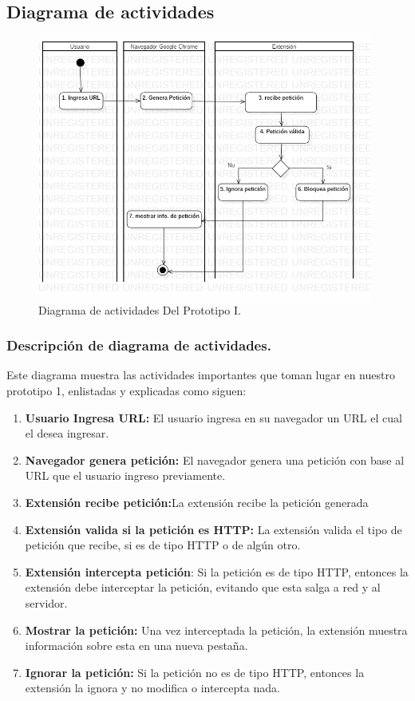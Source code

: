 \documentclass[12pt, a4paper, titlepage]{report}
\begin{document}
			        
			        
			\subsection{Diagrama de actividades}
			    \begin{figure}[H]
				    \begin{center} \includegraphics[width=11cm]{./imagenes/Desarrollo/Prototipo_1/DA_P1.png}
				        \caption{Diagrama de actividades Del Prototipo I.}
			        \end{center}
			    \end{figure}
			    
			\subsubsection{Descripción de diagrama de actividades.}
			Este diagrama muestra las actividades importantes que toman lugar en nuestro prototipo 1, enlistadas y explicadas como siguen: 
			
			\begin{enumerate}
			    \item \textbf{Usuario Ingresa URL:} El usuario ingresa en su navegador un URL el cual el desea ingresar.
			    \item \textbf{Navegador genera petición:} El navegador genera una petición con base al URL que el usuario ingreso previamente.
			    \item \textbf{Extensión recibe petición:}La extensión recibe la petición generada
			    \item \textbf{Extensión valida si la petición es HTTP:} La extensión valida el tipo de petición que recibe, si es de tipo HTTP o de algún otro.
			    \item \textbf{Extensión intercepta petición}: Si la petición es de tipo HTTP, entonces la extensión debe interceptar la petición, evitando que esta salga a red y al servidor.
			    \item \textbf{Mostrar la petición:} Una vez interceptada la petición, la extensión muestra información sobre esta en una nueva pestaña.
			    \item \textbf{Ignorar la petición:} Si la petición no es de tipo HTTP, entonces la extensión la ignora y no modifica o intercepta nada.
			\end{enumerate}
			
\end{document}
